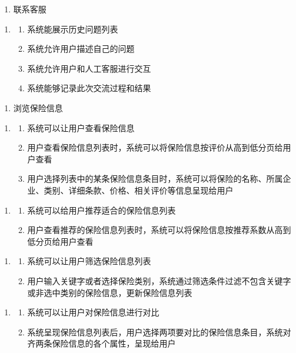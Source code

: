 \documentclass[a4paper]{ctexart}
\begin{document}
\begin{enumerate}[label=UR3.]
  \item 联系客服
\end{enumerate}
\begin{enumerate}[label=SR3.]
  \item 
  \begin{enumerate}[label=\arabic*).]
    \item 系统能展示历史问题列表
    \item 系统允许用户描述自己的问题
    \item 系统允许用户和人工客服进行交互
    \item 系统能够记录此次交流过程和结果
  \end{enumerate}
\end{enumerate}

\begin{enumerate}[label=UR4.]
  \item 浏览保险信息
\end{enumerate}
\begin{enumerate}[label=SR4.]
  \item 
  \begin{enumerate}[label=\arabic*).]
    \item 系统可以让用户查看保险信息
    \item 用户查看保险信息列表时，系统可以将保险信息按评价从高到低分页给用户查看
    \item 用户选择列表中的某条保险信息条目时，系统可以将保险的名称、所属企业、类别、详细条款、价格、相关评价等信息呈现给用户
  \end{enumerate}
\end{enumerate}
\begin{enumerate}[label=SR5.]
  \item 
  \begin{enumerate}[label=\arabic*).]
    \item 系统可以给用户推荐适合的保险信息列表
    \item 用户查看推荐的保险信息列表时，系统可以将保险信息按推荐系数从高到低分页给用户查看
  \end{enumerate}
\end{enumerate}
\begin{enumerate}[label=SR6.]
  \item 
  \begin{enumerate}[label=\arabic*).]
    \item 系统可以让用户筛选保险信息列表
    \item 用户输入关键字或者选择保险类别，系统通过筛选条件过滤不包含关键字或非选中类别的保险信息，更新保险信息列表
  \end{enumerate}
\end{enumerate}
\begin{enumerate}[label=SR7.]
  \item 
  \begin{enumerate}[label=\arabic*).]
    \item 系统可以让用户对保险信息进行对比
    \item 系统呈现保险信息列表后，用户选择两项要对比的保险信息条目，系统对齐两条保险信息的各个属性，呈现给用户
  \end{enumerate}
\end{enumerate}
\end{document}
